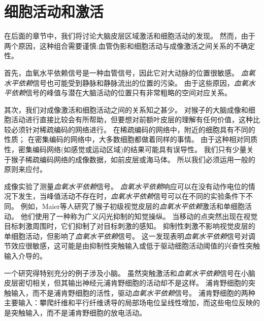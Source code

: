 \section{细胞活动和激活}

在后面的章节中，我们将讨论大脑皮层区域激活和细胞活动的发现。
然而，由于两个原因，这种组合需要谨慎:血管伪影和细胞活动与成像激活之间关系的不确定性。

\par
首先，血氧水平依赖信号是一种血管信号，因此它对大动脉的位置很敏感。
\textit{血氧水平依赖}信号也可能受到静脉和静脉流出的位置的污染\cite{turner2002much}。
由于这些原因，\textit{血氧水平依赖}信号的峰值与潜在大脑活动的位置只有非常粗略的空间对应关系\cite{kim2004spatial}。


\par
其次，我们对成像激活和细胞活动之间的关系知之甚少。
对猴子的大脑成像和细胞活动进行直接比较会有所帮助，但要想对前额叶皮层的理解有任何价值，这种比较必须针对稀疏编码的网络进行。
在稀疏编码的网络中，附近的细胞具有不同的性质；
在密集编码的网络中，大多数细胞都做着同样的事情。
由于这种相对同质性，密集编码网络(如感觉或运动区域)的结果可能具有误导性。
我们只有少量关于猴子稀疏编码网络的成像数据，如前皮层或海马体\cite{nakahara2002functional,orban2004comparative}。
所以我们必须运用一般的原则来应付。


\par
成像实验了测量\textit{血氧水平依赖}信号。
\textit{血氧水平依赖}响应可以在没有动作电位的情况下发生\cite{logothetis2002neural}，当峰值活动不存在时，\textit{血氧水平依赖}信号可以在不同的实验条件下不同。
例如，Maier等人\cite{maier2008divergence}研究了猴子初级视觉皮层的\textit{血氧水平依赖}激活和单细胞活动。
他们使用了一种称为广义闪光抑制的知觉操纵。
当移动的点突然出现在视觉目标刺激周围时，它们抑制了对目标刺激的感知。
抑制性刺激不影响视觉皮层的单细胞活动，但影响了\textit{血氧水平依赖}信号。
这一发现表明\textit{血氧水平依赖}信号对调节效应很敏感\cite{logothetis2008we}，这可能是由抑制性突触输入或低于驱动细胞活动阈值的兴奋性突触输入介导的。


\par
一个研究得特别充分的例子涉及小脑。
虽然突触激活和\textit{血氧水平依赖}信号在小脑皮层密切相关，但其输出神经元浦肯野细胞的活动却不是这样\cite{thomsen2004principal}。
浦肯野细胞的突触输入，而不是浦肯野细胞的活性，驱动\textit{血氧水平依赖}信号\cite{gold2002neuronal}。
浦肯野细胞的两种主要输入：攀爬纤维\cite{offenhauser2005activity}和平行纤维\cite{thomsen2009principal}诱导的局部场电位呈线性增加，而这些电位反映的是突触输入，而不是浦肯野细胞的放电活动。


